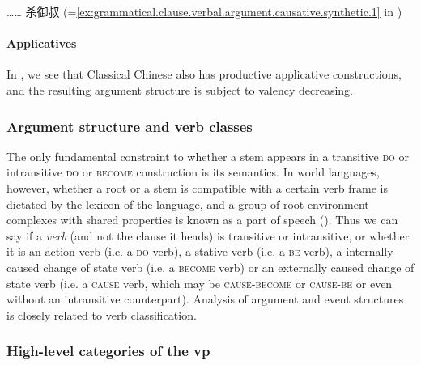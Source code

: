 \documentclass[UTF8, a4paper, oneside, scheme=plain, 12pt]{ctexrep}
\newcommand*{\category}[1]{\textsc{#1}}
\begin{document}
\begin{exe}
    \ex\label{ex:grammatical.clause.verbal.argument.valency-alternation.1} …… 杀御叔 (=\ref{ex:grammatical.clause.verbal.argument.causative.synthetic.1} in )
\end{exe}

\paragraph{Applicatives}

In ,
we see that Classical Chinese also has productive applicative constructions,
and the resulting argument structure is subject to valency decreasing.



\subsubsection{Argument structure and verb classes}\label{sec:grammatical.clause.argument.lexical}

The only fundamental constraint to whether a stem appears in a transitive \category{do} or intransitive \category{do} or \category{become} construction is its semantics.
In world languages, however, whether a root or a stem is compatible with a certain verb frame
is dictated by the lexicon of the language,
and a group of root-environment complexes with shared properties 
is known as a part of speech ().
Thus we can say if a \emph{verb} (and not the clause it heads) is transitive or intransitive,
or whether it is an action verb (i.e. a \category{do} verb),
a stative verb (i.e. a \category{be} verb),
a internally caused change of state verb (i.e. a \category{become} verb)
or an externally caused change of state verb (i.e. a \category{cause} verb,
which may be \category{cause}-\category{become} or \category{cause}-\category{be}
or even without an intransitive counterpart).
Analysis of argument and event structures is closely related to verb classification.

\subsubsection{High-level categories of the \ac{vp}}\label{sec:grammatical.clause.argument.high-level}
\end{document}
